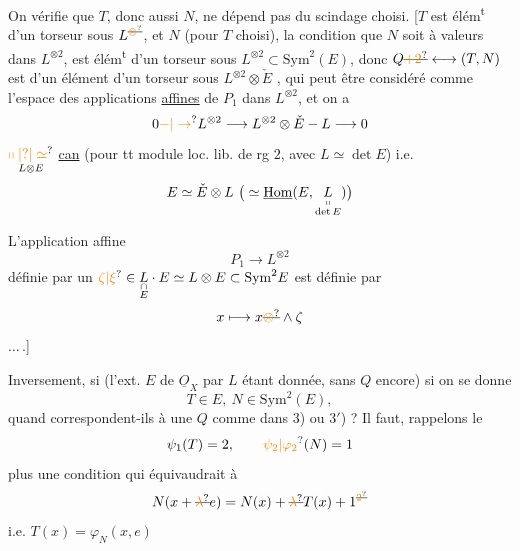  On vérifie que $T$, donc aussi $N$, ne dépend pas du scindage choisi. [$T$ est élém\textsuperscript{t} d'un torseur  sous $L^{\deleted{\unsure{\otimes}}}$,  et $N$ (pour $T$ choisi),  la condition que $N$ soit à valeurs dans $L^{\otimes2}$, est élém\textsuperscript{t} d'un torseur sous $L^{\otimes2}\subset\mathrm{Sym}^2(E)$, donc  $Q\deleted{\unsure{+2}}\longleftrightarrow(T,N)$ est 
d'un élément d'un torseur sous $L^{\otimes2}\otimes\check E$ , qui  peut être considéré comme l'espace des applications \uline{affines} de $P_1$ dans $L^{\otimes2}$,   et on a
\[
0\unsure{\mathbin{-}|\to}L^{\otimes2}\longrightarrow L^{\otimes2}\otimes\check E\mathbin{-}L\longrightarrow0
\]
$\underset{L\otimes E}{\unsure{\shortparallel|?|\simeq}}$ \uline{can} (pour tt module loc. lib. de rg $2$,  avec $L\simeq\det E$) i.e.
\[
E\simeq\check E\otimes L\ \big(\simeq\underline{\mathrm{Hom}}(E,\underset{\substack{\shortparallel\\\det E}}L)\big)
\]

L'application affine
\[
P_1\longrightarrow L^{\otimes2}
\]
définie par un $\unsure{\zeta|\xi}\in\underset{\substack{\cap\\E}}L\cdot E\simeq L\otimes E\subset\mathrm{Sym}^2E$
est définie par
\[
x\longmapsto x\deleted{\unsure{\otimes}}\wedge\zeta
\]
$\ldots\,.$]

Inversement, si (l'ext. $E$ de $\underline O_X$ par $L$ étant donnée, sans $Q$ encore) si on se donne
\[
T\in E,\ N\in\mathrm{Sym}^2(E),
\]
quand correspondent-ils à une $Q$ comme dans 3) ou 3$'$) ? Il faut, rappelons le
\[
\psi_1(T)=2,\qquad\unsure{\psi_2|\varphi_2}(N)=1
\]
plus une condition qui équivaudrait à
\[
N(x+\deleted{\unsure{\lambda}}e)=N(x)+\deleted{\unsure{\lambda}}T(x)+1^{\deleted{\unsure{2}}}
\]
i.e. $T(x)=\varphi_N(x,e)$

